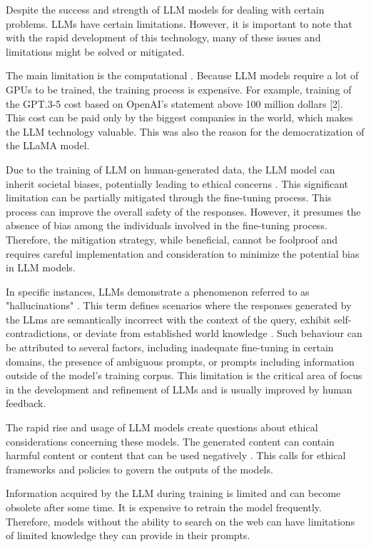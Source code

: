 Despite the success and strength of LLM models for dealing with certain problems. LLMs have certain limitations. However, it is important to note that with the rapid development of this technology, many of these issues and limitations might be solved or mitigated. 


The main limitation is the computational \cite{naveed2023comprehensive}. Because LLM models require a lot of GPUs to be trained, the training process is expensive. For example, training of the GPT.3-5 cost based on OpenAI's statement above 100 million dollars [2]. This cost can be paid only by the biggest companies in the world, which makes the LLM technology valuable. This was also the reason for the democratization of the LLaMA model. 


Due to the training of LLM on human-generated data, the LLM model can inherit societal biases, potentially leading to ethical concerns \cite{naveed2023comprehensive}. This significant limitation can be partially mitigated through the fine-tuning process. This process can improve the overall safety of the responses. However, it presumes the absence of bias among the individuals involved in the fine-tuning process. Therefore, the mitigation strategy, while beneficial, cannot be foolproof and requires careful implementation and consideration to minimize the potential bias in LLM models.


In specific instances, LLMs demonstrate a phenomenon referred to as "hallucinations" \cite{naveed2023comprehensive}. This term defines scenarios where the responses generated by the LLms are semantically incorrect with the context of the query, exhibit self-contradictions, or deviate from established world knowledge \cite{naveed2023comprehensive}. Such behaviour can be attributed to several factors, including inadequate fine-tuning in certain domains, the presence of ambiguous prompts, or prompts including information outside of the model's training corpus. This limitation is the critical area of focus in the development and refinement of LLMs and is usually improved by human feedback. 

The rapid rise and usage of LLM models create questions about ethical considerations concerning these models. The generated content can contain harmful content or content that can be used negatively \cite{naveed2023comprehensive}. This calls for ethical frameworks and policies to govern the outputs of the models. 

Information acquired by the LLM during training is limited and can become obsolete after some time. It is expensive to retrain the model frequently. \cite{naveed2023comprehensive} Therefore, models without the ability to search on the web can have limitations of limited knowledge they can provide in their prompts. 


